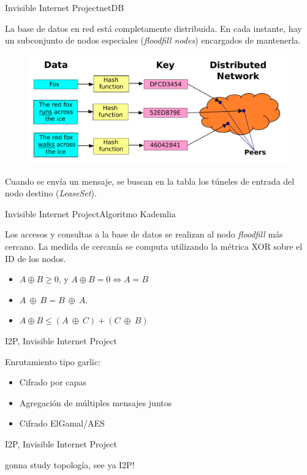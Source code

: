\documentclass[spanish]{beamer}
\begin{document}
\begin{frame}{Invisible Internet Project}{netDB}

La base de datos en red está completamente distribuida. En cada instante, hay un subconjunto de nodos especiales (\textit{floodfill nodes}) encargados de mantenerla.\\

\begin{figure}
	\centering
	\includegraphics[width=.6\textwidth]{img/DHT.pdf}
\end{figure}

Cuando se envía un mensaje, se buscan en la tabla los túneles de entrada del nodo destino (\textit{LeaseSet}).
\end{frame}

\begin{frame}{Invisible Internet Project}{Algoritmo Kademlia}

Los accesos y consultas a la base de datos se realizan al nodo \textit{floodfill} más cercano. La medida de cercanía se computa utilizando la métrica XOR sobre el ID de los nodos.

\begin{itemize}
	\item $A \oplus B \ge 0$, y $A \oplus B = 0 \iff A = B$ 
	\item $A \ \oplus \ B = B \ \oplus \ A$.
	\item $A \oplus B \leq (A \ \oplus \ C) + (C \ \oplus \ B)$
\end{itemize}
	
\end{frame}





\begin{frame}{I2P, Invisible Internet Project}
	
Enrutamiento tipo garlic:


\vspace{1.9em}


\begin{itemize}
	\item Cifrado por capas
	\item Agregación de múltiples mensajes juntos
	\item Cifrado ElGamal/AES
\end{itemize}
	
	
\end{frame}



\begin{frame}{I2P, Invisible Internet Project}

gonna study topología, see ya I2P!

\end{frame}
\end{document}
